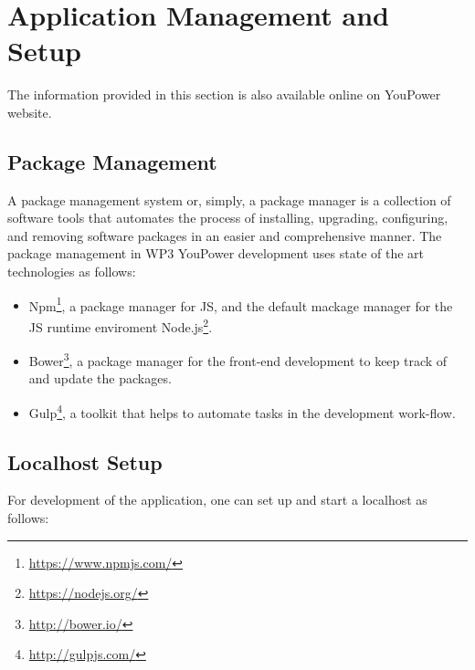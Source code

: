 \section{Application Management and Setup}
\label{sec:setup}

The information provided in this section is also available online on YouPower website.

\subsection{Package Management}

A package management system or, simply, a package manager is a collection of software tools that automates the process of installing, upgrading, configuring, and removing software packages in an easier and comprehensive manner. 
The package management in WP3 YouPower development uses state of the art technologies as follows: 

\begin{itemize}
\item Npm\footnote{\url{https://www.npmjs.com/}}, a package manager for JS,  and the default mackage manager for the JS runtime enviroment Node.js\footnote{\url{https://nodejs.org/}}. 

\item Bower\footnote{\url{http://bower.io/}}, a package manager for the front-end development to keep track of and update the packages. 

\item Gulp\footnote{\url{http://gulpjs.com/}}, a toolkit that helps to automate tasks in the development work-flow. 

\end{itemize}

\subsection{Localhost Setup}

For development of the application, one can set up and start a localhost as follows: 

